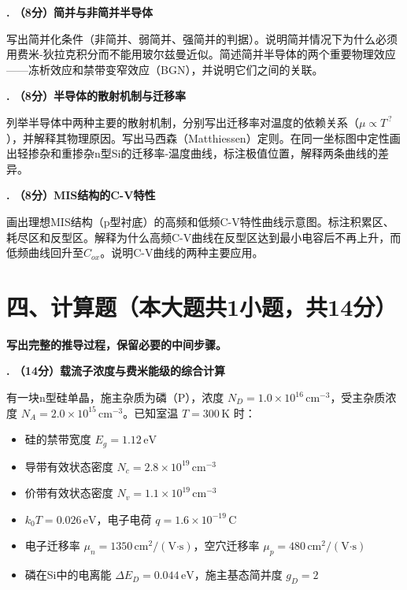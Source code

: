 \documentclass[12pt,a4paper]{ctexart}
\newcounter{qcounter}
\newcommand{\选择题}{\stepcounter{qcounter}\arabic{qcounter}.\,}
\newcommand{\填空题}{\stepcounter{qcounter}\arabic{qcounter}.\,}
\begin{document}
\vspace{12cm}

\noindent\textbf{. （8分）简并与非简并半导体}

写出简并化条件（非简并、弱简并、强简并的判据）。说明简并情况下为什么必须用费米-狄拉克积分而不能用玻尔兹曼近似。简述简并半导体的两个重要物理效应——冻析效应和禁带变窄效应（BGN），并说明它们之间的关联。

\vspace{12cm}

\newpage

\noindent\textbf{. （8分）半导体的散射机制与迁移率}

列举半导体中两种主要的散射机制，分别写出迁移率对温度的依赖关系（$\mu \propto T^{\,?}$），并解释其物理原因。写出马西森（Matthiessen）定则。在同一坐标图中定性画出轻掺杂和重掺杂n型Si的迁移率-温度曲线，标注极值位置，解释两条曲线的差异。

\vspace{11cm}

\noindent\textbf{. （8分）MIS结构的C-V特性}

画出理想MIS结构（p型衬底）的高频和低频C-V特性曲线示意图。标注积累区、耗尽区和反型区。解释为什么高频C-V曲线在反型区达到最小电容后不再上升，而低频曲线回升至$C_{ox}$。说明C-V曲线的两种主要应用。

\newpage

\section*{四、计算题（本大题共1小题，共14分）}

\textbf{写出完整的推导过程，保留必要的中间步骤。}

\vspace{4pt}

\setcounter{qcounter}{0}

\noindent\textbf{. （14分）载流子浓度与费米能级的综合计算}

有一块n型硅单晶，施主杂质为磷（P），浓度 $N_D = 1.0 \times 10^{16}\,\text{cm}^{-3}$，受主杂质浓度 $N_A = 2.0 \times 10^{15}\,\text{cm}^{-3}$。已知室温 $T = 300\,\text{K}$ 时：

\begin{itemize}[nosep]
\item 硅的禁带宽度 $E_g = 1.12\,\text{eV}$
\item 导带有效状态密度 $N_c = 2.8 \times 10^{19}\,\text{cm}^{-3}$
\item 价带有效状态密度 $N_v = 1.1 \times 10^{19}\,\text{cm}^{-3}$
\item $k_0T = 0.026\,\text{eV}$，电子电荷 $q = 1.6 \times 10^{-19}\,\text{C}$
\item 电子迁移率 $\mu_n = 1350\,\text{cm}^2/(\text{V·s})$，空穴迁移率 $\mu_p = 480\,\text{cm}^2/(\text{V·s})$
\item 磷在Si中的电离能 $\Delta E_D = 0.044\,\text{eV}$，施主基态简并度 $g_D = 2$
\end{itemize}
\end{document}
